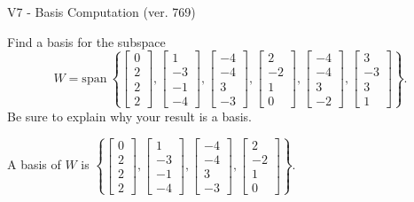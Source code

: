 \begin{exercise}
  \begin{exerciseTitle}V7 - Basis Computation (ver. 769)\end{exerciseTitle}
  \begin{exerciseStatement}
    Find a basis for the subspace 
\[W=\mathrm{span}\ \left\{\left[\begin{array}{r}
0 \\
2 \\
2 \\
2
\end{array}\right] , \left[\begin{array}{r}
1 \\
-3 \\
-1 \\
-4
\end{array}\right] , \left[\begin{array}{r}
-4 \\
-4 \\
3 \\
-3
\end{array}\right] , \left[\begin{array}{r}
2 \\
-2 \\
1 \\
0
\end{array}\right] , \left[\begin{array}{r}
-4 \\
-4 \\
3 \\
-2
\end{array}\right] , \left[\begin{array}{r}
3 \\
-3 \\
3 \\
1
\end{array}\right]\right\}.\]
 Be sure to explain why your result is a basis.


  \end{exerciseStatement}
  \begin{exerciseAnswer}
   A basis of \(W\) is  \(\left\{\left[\begin{array}{r}
0 \\
2 \\
2 \\
2
\end{array}\right] , \left[\begin{array}{r}
1 \\
-3 \\
-1 \\
-4
\end{array}\right] , \left[\begin{array}{r}
-4 \\
-4 \\
3 \\
-3
\end{array}\right] , \left[\begin{array}{r}
2 \\
-2 \\
1 \\
0
\end{array}\right]\right\}\).
  


  \end{exerciseAnswer}
\end{exercise}